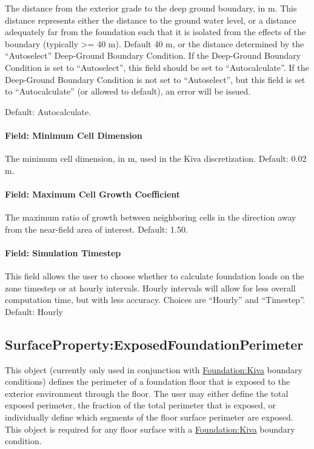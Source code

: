 The distance from the exterior grade to the deep ground boundary, in m.
This distance represents either the distance to the ground water level,
or a distance adequately far from the foundation such that it is
isolated from the effects of the boundary (typically \textgreater{}= 40
m). Default 40 m, or the distance determined by the ``Autoselect'' Deep-Ground
Boundary Condition. If the Deep-Ground Boundary Condition is set to ``Autoselect'', this field
should be set to ``Autocalculate''. If the Deep-Ground Boundary Condition is not set
to ``Autoselect'', but this field is set to ``Autocalculate'' (or allowed to default), an error
will be issued.

Default: Autocalculate.

\paragraph{Field: Minimum Cell Dimension}\label{foundation-kiva-settings-minimum-cell-dimension}

The minimum cell dimension, in m, used in the Kiva discretization.
Default: 0.02 m.

\paragraph{Field: Maximum Cell Growth Coefficient}\label{foundation-kiva-settings-maximum-cell-growth-coefficient}

The maximum ratio of growth between neighboring cells in the direction
away from the near-field area of interest. Default: 1.50.

\paragraph{Field: Simulation Timestep}\label{foundation-kiva-settings-simulation-timestep}

This field allows the user to choose whether to calculate foundation
loads on the zone timestep or at hourly intervals. Hourly intervals will
allow for less overall computation time, but with less accuracy. Choices
are ``Hourly'' and ``Timestep''. Default: Hourly

\subsection{SurfaceProperty:ExposedFoundationPerimeter}\label{surfaceproperty-exposedfoundationperimeter}

This object (currently only used in conjunction with \hyperref[foundationkiva]{Foundation:Kiva}
boundary conditions) defines the perimeter of a foundation floor that is
exposed to the exterior environment through the floor. The user may
either define the total exposed perimeter, the fraction of the total
perimeter that is exposed, or individually define which segments of the
floor surface perimeter are exposed. This object is required for any floor surface with a \hyperref[foundationkiva]{Foundation:Kiva} boundary condition.

